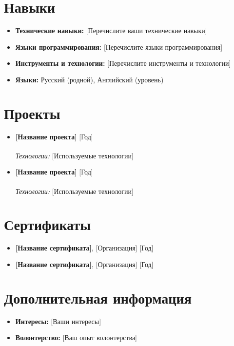\documentclass[a4paper,11pt]{article}
\begin{document}
\section{Навыки}
\begin{itemize}[leftmargin=*]
  \item \textbf{Технические навыки:} [Перечислите ваши технические навыки]
  \item \textbf{Языки программирования:} [Перечислите языки программирования]
  \item \textbf{Инструменты и технологии:} [Перечислите инструменты и технологии]
  \item \textbf{Языки:} Русский (родной), Английский (уровень)
\end{itemize}

\section{Проекты}
\begin{itemize}[leftmargin=*]
  \item \textbf{[Название проекта]} \hfill [Год]\\
  [Краткое описание проекта]\\
  \textit{Технологии:} [Используемые технологии]

  \item \textbf{[Название проекта]} \hfill [Год]\\
  [Краткое описание проекта]\\
  \textit{Технологии:} [Используемые технологии]
\end{itemize}

\section{Сертификаты}
\begin{itemize}[leftmargin=*]
  \item \textbf{[Название сертификата]}, [Организация] \hfill [Год]
  \item \textbf{[Название сертификата]}, [Организация] \hfill [Год]
\end{itemize}

\section{Дополнительная информация}
\begin{itemize}[leftmargin=*]
  \item \textbf{Интересы:} [Ваши интересы]
  \item \textbf{Волонтерство:} [Ваш опыт волонтерства]
\end{itemize}
\end{document}
